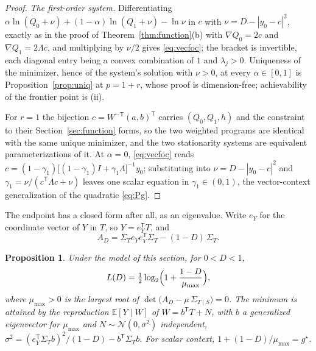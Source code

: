 \documentclass[11pt,onecolumn]{IEEEtran}
\newtheorem{proposition}[theorem]{Proposition}
\newcommand{\E}{\mathbb{E}}
\begin{document}
\begin{proof}
\emph{The first-order system.} Differentiating
$\alpha\ln(Q_0+\nu)+(1-\alpha)\ln(Q_1+\nu)-\ln\nu$ in $c$ with
$\nu=D-|y_0-c|^2$, exactly as in the proof of
Theorem~\ref{thm:function}(b) with $\nabla Q_0=2c$ and
$\nabla Q_1=2\Lambda c$, and multiplying by $\nu/2$ gives
\eqref{eq:vecfoc}; the bracket is invertible, each diagonal entry being
a convex combination of $1$ and $\lambda_j>0$. Uniqueness of the
minimizer, hence of the system's solution with $\nu>0$, at every
$\alpha\in[0,1]$ is Proposition~\ref{prop:uniq} at $p=1+r$, whose proof
is dimension-free; achievability of the frontier point is (ii).

For $r=1$ the bijection $c=W^{-\mathsf T}(a,b)^{\mathsf T}$ carries
$(Q_0,Q_1,h)$ and the constraint to their Section~\ref{sec:function}
forms, so the two weighted programs are identical with the same unique
minimizer, and the two stationarity systems are equivalent
parameterizations of it. At $\alpha=0$, \eqref{eq:vecfoc} reads
$c=(1-\gamma_1)\bigl[(1-\gamma_1)I+\gamma_1\Lambda\bigr]^{-1}y_0$;
substituting into $\nu=D-|y_0-c|^2$ and
$\gamma_1=\nu/(c^{\mathsf T}\Lambda c+\nu)$ leaves one scalar equation in
$\gamma_1\in(0,1)$, the vector-context generalization of the
quadratic \eqref{eq:Pg}.
\end{proof}

The endpoint has a closed form after all, as an eigenvalue. Write $e_Y$
for the coordinate vector of $Y$ in $T$, so $Y=e_Y^{\mathsf T}T$, and
\[
A_D=\Sigma_Te_Ye_Y^{\mathsf T}\Sigma_T-(1-D)\,\Sigma_T .
\]

\begin{proposition}\label{prop:pencil}
Under the model of this section, for $0<D<1$,
\begin{equation}
L(D)=\tfrac12\log_2\Bigl(1+\frac{1-D}{\mu_{\max}}\Bigr),
\label{eq:pencil}
\end{equation}
where $\mu_{\max}>0$ is the largest root of
$\det\bigl(A_D-\mu\,\Sigma_{T\mid S}\bigr)=0$. The minimum is attained by
the reproduction $\E[Y\mid W]$ of $W=b^{\mathsf T}T+N$, with $b$ a
generalized eigenvector for $\mu_{\max}$ and $N\sim\mathcal N(0,\sigma^2)$
independent, $\sigma^2=(e_Y^{\mathsf T}\Sigma_Tb)^2/(1-D)-b^{\mathsf T}\Sigma_Tb$.
For scalar context, $1+(1-D)/\mu_{\max}=g^\star$.
\end{proposition}
\end{document}
